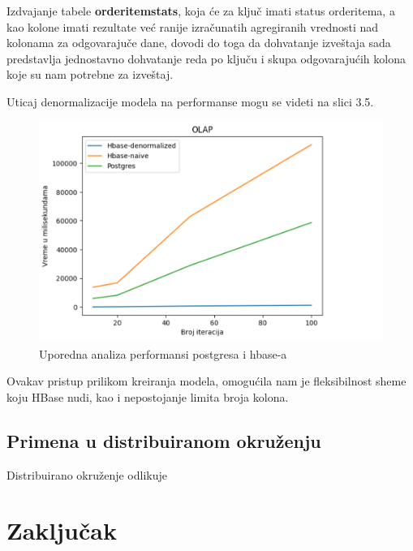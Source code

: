 \documentclass[12pt,oneside]{memoir}
\begin{document}
Izdvajanje tabele \textbf{orderitemstats}, koja će za ključ imati status orderitema, a kao kolone imati rezultate već ranije izračunatih agregiranih vrednosti nad kolonama za odgovarajuče dane, dovodi do toga da dohvatanje izveštaja sada predstavlja jednostavno dohvatanje reda po ključu i skupa odgovarajućih kolona koje su nam potrebne za izveštaj.

Uticaj denormalizacije modela na performanse mogu se videti na slici 3.5.

\begin{figure}[!ht]
  \centering
  \includegraphics[width=1\textwidth]{olap-vizualization.png}
  \caption{Uporedna analiza performansi postgresa i hbase-a}
  \label{fig:grafikon}
\end{figure}

Ovakav pristup prilikom kreiranja modela, omogućila nam je fleksibilnost sheme koju HBase nudi, kao i nepostojanje limita broja kolona. 

\pagebreak


\section{Primena u distribuiranom okruženju}


Distribuirano okruženje odlikuje 

\chapter{Zaključak}

\literatura
\end{document}

